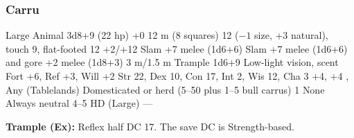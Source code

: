 \subsubsection{Carru}
\begin{MonsterStats}
{Large Animal}
{3d8+9 (22 hp)}
{+0}
{12 m (8 squares)}
{12 ($-1$ size, +3 natural), touch 9, flat-footed 12}
{+2/+12}
{Slam +7 melee (1d6+6)}
{Slam +7 melee (1d6+6) and gore +2 melee (1d8+3)}
{3 m/1.5 m}
{Trample 1d6+9}
{Low-light vision, scent}
{Fort +6, Ref +3, Will +2}
{Str 22, Dex 10, Con 17, Int 2, Wis 12, Cha 3}
{ +4,  +4}
{, }
{Any (Tablelands)}
{Domesticated or herd (5--50 plus 1--5 bull carrus)}
{1}
{None}
{Always neutral}
{4--5 HD (Large)}
{---}
\end{MonsterStats}

\textbf{Trample (Ex):} Reflex half DC 17. The save DC is Strength-based.
